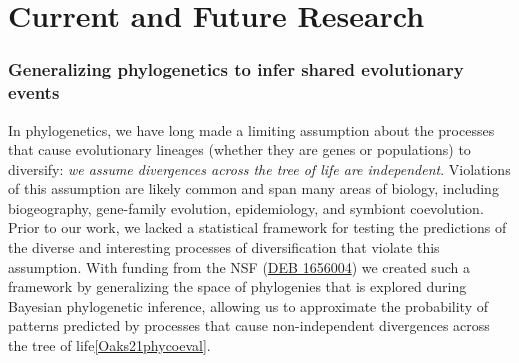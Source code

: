 




\section*{Current and Future Research}


\subsubsection*{Generalizing phylogenetics to infer shared evolutionary events}
In phylogenetics, we have long made a limiting assumption about the processes
that cause evolutionary lineages (whether they are genes or populations) to
diversify: \textit{we assume divergences across the tree of life are independent}.
Violations of this assumption are likely common and span many areas of biology,
including biogeography, gene-family evolution, epidemiology, and symbiont
coevolution.
Prior to our work, we lacked a statistical framework for testing the
predictions of the diverse and interesting processes of diversification that
violate this assumption.
With funding from the NSF
(\href{https://www.nsf.gov/awardsearch/showAward?AWD_ID=1656004&HistoricalAwards=false}{DEB 1656004})
we created such a framework by generalizing the space of phylogenies that is
explored during Bayesian phylogenetic inference,
allowing us to approximate the probability
of patterns predicted by processes that cause non-independent divergences 
across the tree of
life\cref{Oaks21phycoeval}.

